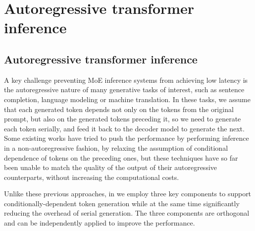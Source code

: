 
\chapter{Autoregressive transformer inference}\label{chapter-4}


\section{Autoregressive transformer inference}

A key challenge preventing MoE inference systems from achieving low latency is the autoregressive nature of many generative tasks of interest, such as sentence completion, language modeling or machine translation. In these tasks, we assume that each generated token depends not only on the tokens from the original prompt, but also on the generated tokens preceding it, so we need to generate each token serially, and feed it back to the decoder model to generate the next. Some existing works have tried to push the performance by performing inference in a non-autoregressive fashion, by relaxing the assumption of conditional dependence of tokens on the preceding ones, but these techniques have so far been unable to match the quality of the output of their autoregressive counterparts, without increasing the computational costs.  

Unlike these previous approaches, in \Project we employ three key components to support conditionally-dependent token generation while at the same time significantly reducing the overhead of serial generation. The three components are orthogonal and can be independently applied to improve the performance.

